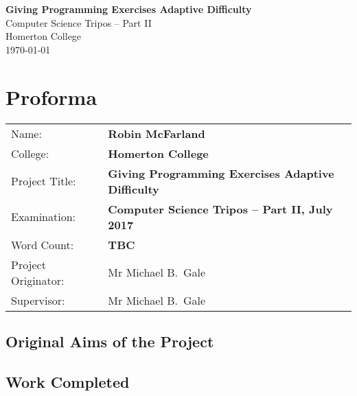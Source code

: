 \documentclass[12pt,a4paper,twoside,openright]{report}
\begin{document}





\pagestyle{empty}


\vspace*{60mm}
\begin{center}
\Huge
\textbf{Giving Programming Exercises Adaptive Difficulty} \\[5mm]
Computer Science Tripos -- Part II \\[5mm]
Homerton College \\[5mm]
\today  %
\end{center}


\pagestyle{plain}

\chapter*{Proforma}

{\large
\begin{tabular}{ll}
Name:               & \bf Robin McFarland                       \\
College:            & \bf Homerton College                     \\
Project Title:      & \bf Giving Programming Exercises Adaptive Difficulty \\
Examination:        & \bf Computer Science Tripos -- Part II, July 2017  \\
Word Count:         & \bf TBC  \\
Project Originator: & Mr Michael B.~Gale                   \\
Supervisor:         & Mr Michael B.~Gale                    \\ 
\end{tabular}
}

\section*{Original Aims of the Project}


\section*{Work Completed}
\end{document}
